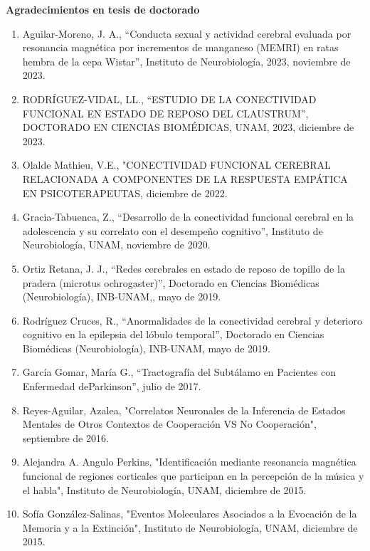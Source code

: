 \documentclass[11pt]{article}
\begin{document}
\textbf{\color{red}Agradecimientos en tesis de doctorado}

\begin{enumerate}
\item Aguilar-Moreno, J. A., “Conducta sexual y actividad cerebral evaluada por resonancia magnética por incrementos de manganeso (MEMRI) en ratas hembra de 
la 
cepa Wistar”, Instituto de Neurobiología, 2023,  noviembre de 2023.

\item RODRÍGUEZ-VIDAL, LL., “ESTUDIO DE LA CONECTIVIDAD FUNCIONAL EN ESTADO DE REPOSO DEL CLAUSTRUM”, DOCTORADO EN CIENCIAS BIOMÉDICAS, UNAM, 2023,  
diciembre de 
2023.

\item Olalde Mathieu, V.E., "CONECTIVIDAD FUNCIONAL CEREBRAL RELACIONADA A COMPONENTES DE LA RESPUESTA EMPÁTICA EN PSICOTERAPEUTAS,  diciembre de 2022.

\item Gracia-Tabuenca, Z., “Desarrollo de la conectividad funcional cerebral en la adolescencia y su correlato con el desempeño cognitivo”, Instituto de 
Neurobiología, UNAM,  noviembre de 2020.

\item Ortiz Retana, J. J., “Redes cerebrales en estado de reposo de topillo de la pradera (microtus ochrogaster)”, Doctorado en Ciencias Biomédicas 
(Neurobiología), INB-UNAM,,  mayo de 2019.

\item Rodríguez Cruces, R., “Anormalidades de la conectividad cerebral y deterioro cognitivo en la epilepsia del lóbulo temporal”, Doctorado en Ciencias 
Biomédicas (Neurobiología), INB-UNAM,  mayo de 2019.

\item García Gomar, María G., “Tractografía del Subtálamo en Pacientes con Enfermedad deParkinson”,  julio de 2017.

\item Reyes-Aguilar, Azalea, "Correlatos Neuronales de la Inferencia de Estados Mentales de Otros Contextos de Cooperación VS No Cooperación",  septiembre 
de 
2016.

\item Alejandra A. Angulo Perkins, "Identificación mediante resonancia magnética funcional de regiones corticales que participan en la percepción de la 
música y 
el habla", Instituto de Neurobiología, UNAM,  diciembre de 2015.

\item Sofía González-Salinas, "Eventos Moleculares Asociados a la Evocación de la Memoria y a la Extinción", Instituto de Neurobiología, UNAM,  diciembre de 
2015.


\end{enumerate}
\end{document}
